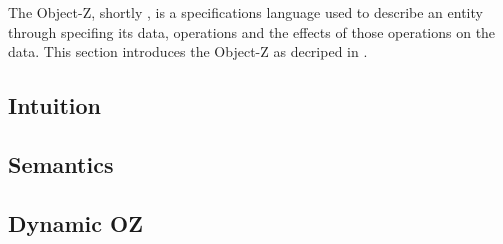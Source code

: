The Object-Z, shortly \oz{}, is a specifications language used to describe an entity through specifing its data, operations and the effects of those operations on the data. This section introduces the Object-Z as decriped in \cite{olderog}.
\subsection{Intuition}
\label{sec_oz_intuition}


\subsection{Semantics}
\label{sec_oz_sem}


\subsection{Dynamic OZ}
\label{sec_oz_dynamic_oz}

